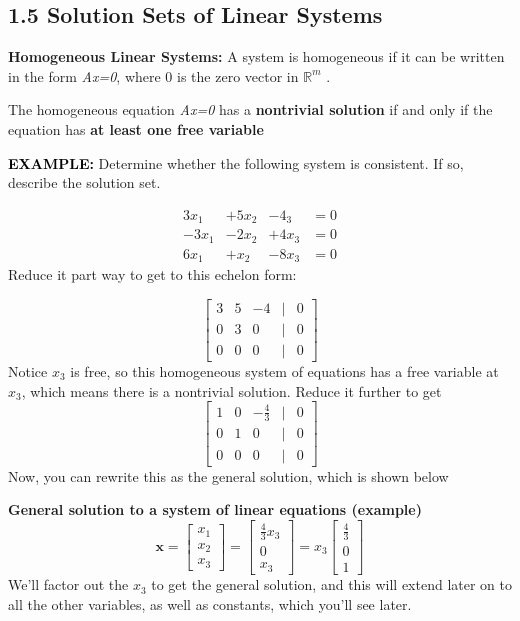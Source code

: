 \documentclass[12pt]{article}
\newcommand{\example}[1]{\noindent\textcolor{black}{\textbf{EXAMPLE:}} #1 \par}
\newcommand{\definition}[2]{
  \noindent\textbf{#1:} #2
}
\begin{document}
\subsection* {1.5 Solution Sets of Linear Systems}
\definition{Homogeneous Linear Systems}{A system is homogeneous if it can be written in the form \textit{Ax=0}, where 0 is the zero vector in $\mathbb{R}^m$}.
\begin{note}
    The homogeneous equation \textit{Ax=0} has a \textbf{nontrivial solution} if and only if the equation has \textbf{at least one free variable}
\end{note}

\example{Determine whether the following system is consistent. If so, describe the solution set.}
\[
    \begin{aligned}
        3x_1 & + 5x_2 & -4_3 & = 0 \\
        -3x_1    &  - 2x_2 & +4x_3 & = 0 \\
        6x_1 & + x_2 &  -8x_3 & = 0
    \end{aligned}
\]
Reduce it part way to get to this echelon form:

\[
\begin{bmatrix}
    3 & 5 & -4 & \vert & 0 \\
    0 & 3 & 0 & \vert & 0 \\
    0 & 0 & 0 & \vert & 0
    
\end{bmatrix}\]
Notice $x_3$ is free, so this homogeneous system of equations has a free variable at $x_3$, which means there is a nontrivial solution.
\newline
Reduce it further to get 
\[
\begin{bmatrix}
    1 & 0 & -\frac{4}{3} & \vert& 0\\
    0 & 1 & 0 & \vert&0\\
    0 & 0 & 0 &\vert& 0
\end{bmatrix}
\]
Now, you can rewrite this as the general solution, which is shown below
\begin{keyconceptbox}
    \textbf{General solution to a system of linear equations (example)}
    \[
        \textbf{x} = \begin{bmatrix}x_1\\x_2\\x_3\end{bmatrix} =  \begin{bmatrix}\frac{4}{3}x_3\\0\\x_3\end{bmatrix} = x_3\begin{bmatrix}\frac{4}{3}\\0\\1\end{bmatrix} 
    \]
    We'll factor out the $x_3$ to get the general solution, and this will extend later on to all the other variables, as well as constants, which you'll see later.
\end{keyconceptbox}
\end{document}
